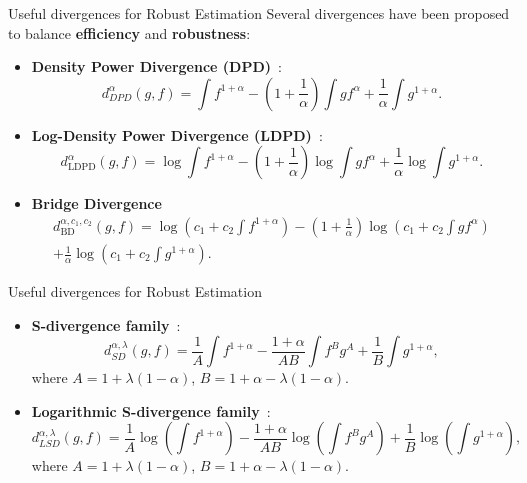 \documentclass[10pt]{beamer}
\begin{document}
\begin{frame}{Useful divergences for Robust Estimation}
Several divergences have been proposed to balance \textbf{efficiency} and \textbf{robustness}:

\begin{itemize}
    \item \textbf{Density Power Divergence (DPD)}~\cite{basu1998robust}:
    \[
    d_{DPD}^{\alpha}(g, f) = \int f^{1+\alpha} - \left(1 + \frac{1}{\alpha}\right) \int g f^\alpha + \frac{1}{\alpha} \int g^{1+\alpha}.
    \]

    \vspace{0.5em}

    \item \textbf{Log-Density Power Divergence (LDPD)}~\cite{jones2001comparison}:
    \[
    d_{\text{LDPD}}^{\alpha}(g, f) = \log \int f^{1+\alpha} - \left(1+\frac{1}{\alpha}\right) \log \int g f^\alpha + \frac{1}{\alpha} \log \int g^{1+\alpha}.
    \]

    \vspace{0.5em}

    \item \textbf{Bridge Divergence}~\cite{kuchibhotla2019bridge}
    \begin{multline*}
        d_{\text{BD}}^{\alpha,c_1,c_2}(g, f) = \log\left( c_1 + c_2 \int f^{1+\alpha} \right)
        - \left(1+\frac{1}{\alpha}\right) \log \left( c_1 + c_2 \int g f^\alpha \right) \\
        + \frac{1}{\alpha} \log \left( c_1 + c_2 \int g^{1+\alpha}\right).        
    \end{multline*}
\end{itemize}
\end{frame}

\begin{frame}{Useful divergences for Robust Estimation}
    \begin{itemize}
        \item \textbf{S-divergence family}~\cite{sdiv}:
        \[
        d_{SD}^{\alpha,\lambda}(g, f) = \frac{1}{A} \int f^{1+\alpha} - \frac{1+\alpha}{AB} \int f^B g^A + \frac{1}{B} \int g^{1+\alpha},
        \]
        where \( A = 1 + \lambda(1-\alpha) \), \( B = 1 + \alpha - \lambda(1-\alpha) \).
        \item \textbf{Logarithmic S-divergence family}~\cite{maji2016logarithmic}:
        \[
        d_{LSD}^{\alpha,\lambda}(g, f) = \frac{1}{A} \log\left( \int f^{1+\alpha} \right) - \frac{1+\alpha}{AB} \log\left( \int f^B g^A \right) + \frac{1}{B} \log\left( \int g^{1+\alpha} \right),
        \]
        where \( A = 1 + \lambda(1-\alpha) \), \( B = 1 + \alpha - \lambda(1-\alpha) \).
    \end{itemize}
\end{frame}
\end{document}
